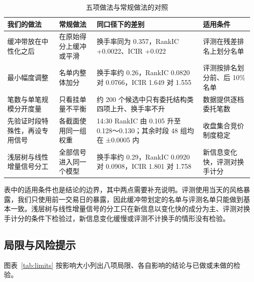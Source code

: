 \documentclass[UTF8,a4paper,zihao=-4,fontset=none]{ctexart}
\newcommand{\tablesetup}{\small\linespread{1.08}\selectfont\renewcommand{\arraystretch}{1.22}}
\begin{document}
\begin{table}[htbp]
\caption{五项做法与常规做法的对照}\label{tab:innov}
\centering
{\tablesetup
\begin{tabularx}{\textwidth}{@{}P{2.9cm} P{2.7cm} L P{3.0cm}@{}}
\toprule
我们的做法 & 常规做法 & 同口径下的差别 & 适用条件\\
\midrule
缓冲带放在中性化之后 & 在原始得分上缓冲或平滑 & 换手率同为 0.357，RankIC +0.0022、ICIR +0.022 & 评测在残差排名上划分名单\\
最小幅度调整 & 名单内整体加分 & 换手率约 0.26，RankIC 0.0820 对 0.0766，ICIR 1.649 对 1.555 & 评测按排名划分前、后 10\% 名单\\
笔数与单笔规模分开度量 & 只看挂单量不平衡 & 约 200 个候选中只有委托结构类四项上升、换手率不升 & 数据提供逐档委托笔数\\
先验证时段特殊性，再设专用信号 & 各截面使用同一组权重 & 14:30 RankIC 由 0.105 升至 0.128～0.130；其余时段 48 组均在 ±0.0005 内 & 收盘集合竞价制度稳定\\
浅层树与线性增量信号分工 & 全部信号进入同一个模型 & 换手率约 0.29，RankIC 0.0920 对 0.0908，ICIR 1.801 对 1.758 & 新信息变化快，评测对换手计分\\
\bottomrule
\end{tabularx}}
\end{table}

表中的适用条件也是结论的边界，其中两点需要补充说明。评测使用当天的风格暴露，我们只使用前一交易日的暴露，因此缓冲带划定的名单与评测名单只能做到基本一致。浅层树与线性增量信号的分工只在新信息以变化快的成分为主、评测对换手计分的条件下检验过，新信息变化缓慢或评测不计换手的情形没有检验。

\subsection{局限与风险提示}\label{sec:limits}

图表~\ref{tab:limits} 按影响大小列出八项局限、各自影响的结论与已做或未做的检验。
\end{document}
